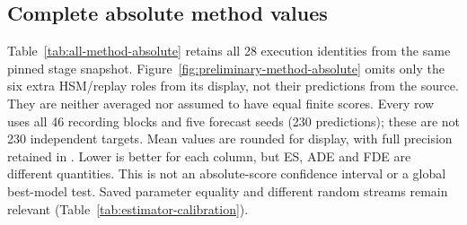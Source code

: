 \subsection{Complete absolute method values}
\label{sec:all-method-absolute}
Table~\ref{tab:all-method-absolute} retains all 28 execution identities from
the same pinned stage snapshot. Figure~\ref{fig:preliminary-method-absolute}
omits only the six extra HSM/replay roles from its display, not their
predictions from the source. They are neither averaged nor assumed to
have equal finite scores. Every row uses all 46 recording blocks and five
forecast seeds (230 predictions); these are not 230 independent targets.
Mean values are rounded for display, with full precision retained in
.
Lower is better for each column, but ES, ADE and FDE are different
quantities. This is not an absolute-score confidence interval or a global
best-model test. Saved parameter equality and different random streams
remain relevant (Table~\ref{tab:estimator-calibration}).
\begingroup\small
